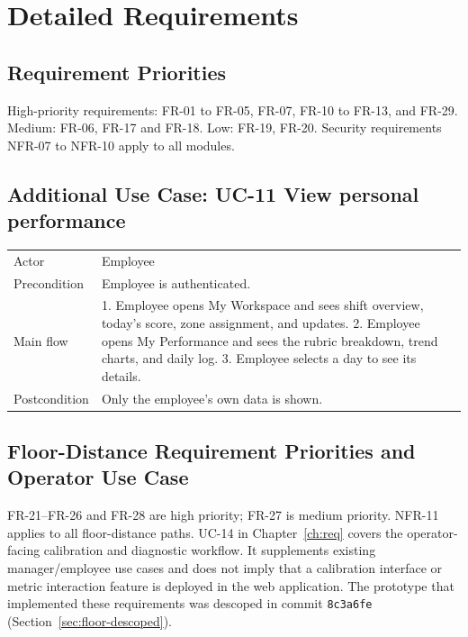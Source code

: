 \chapter{Detailed Requirements}
\section{Requirement Priorities}
High-priority requirements: FR-01 to FR-05, FR-07, FR-10 to FR-13, and FR-29. Medium: FR-06, FR-17 and FR-18. Low: FR-19, FR-20. Security requirements NFR-07 to NFR-10 apply to all modules.

\section{Additional Use Case: UC-11 View personal performance}
\begin{tabular}{P{0.22\textwidth}P{0.68\textwidth}}
\toprule
Actor & Employee\\
Precondition & Employee is authenticated.\\
Main flow & 1. Employee opens My Workspace and sees shift overview, today's score, zone assignment, and updates. 2. Employee opens My Performance and sees the rubric breakdown, trend charts, and daily log. 3. Employee selects a day to see its details.\\
Postcondition & Only the employee's own data is shown.\\
\bottomrule
\end{tabular}

\section{Floor-Distance Requirement Priorities and Operator Use Case}
FR-21--FR-26 and FR-28 are high priority; FR-27 is medium priority. NFR-11 applies to all floor-distance paths. UC-14 in Chapter~\ref{ch:req} covers the operator-facing calibration and diagnostic workflow. It supplements existing manager/employee use cases and does not imply that a calibration interface or metric interaction feature is deployed in the web application. The prototype that implemented these requirements was descoped in commit \texttt{8c3a6fe} (Section~\ref{sec:floor-descoped}).
